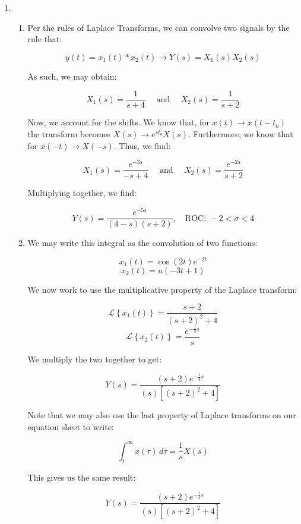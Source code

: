 \begin{enumerate}

  \item

    \begin{enumerate}

      \item Per the rules of Laplace Transforms, we can convolve two signals by the rule that:

        $$y(t)=x_1(t)*x_2(t)\to Y(s)=X_1(s)X_2(s)$$

        As such, we may obtain:

        $$X_1(s)=\frac{1}{s+4}\quad\text{ and }\quad X_2(s)=\frac{1}{s+2}$$

        Now, we account for the shifts. We know that, for $x(t)\to x(t-t_o)$ the transform becomes $X(s)\to e^{st_o}X(s)$. Furthermore, we know that for $x(-t)\to X(-s)$. Thus, we find:

        $$X_1(s)=\frac{e^{-3s}}{-s+4}\quad\text{ and }\quad X_2(s)=\frac{e^{-2s}}{s+2}$$

        Multiplying together, we find:

        $$\boxed{Y(s)=\frac{e^{-5s}}{(4-s)(s+2)},\quad\text{ROC: } -2<\sigma<4}$$

      \item We may write this integral as the convolution of two functions:

        $$x_1(t)=\cos(2t)e^{-2t}$$
        $$x_2(t)=u(-3t+1)$$

        We now work to use the multiplicative property of the Laplace transform:

        $$\mathcal{L}\left\{ x_1(t) \right\}=\frac{s+2}{(s+2)^2+4}$$
        $$\mathcal{L}\left\{ x_2(t) \right\}=\frac{e^{-\frac{1}{3}s}}{s}$$

        We multiply the two together to get:

        $$\boxed{Y(s)=\frac{(s+2)e^{-\frac{1}{3}s}}{(s)[(s+2)^2+4]}}$$

        Note that we may also use the last property of Laplace transforms on our equation sheet to write:

        $$\int_t^{\infty} x(\tau)\,d\tau= \frac{1}{s}X(s)$$

        This gives us the same result:

        $$\boxed{Y(s)=\frac{(s+2)e^{-\frac{1}{3}s}}{(s)[(s+2)^2+4]}}$$

    \end{enumerate}


\end{enumerate}
